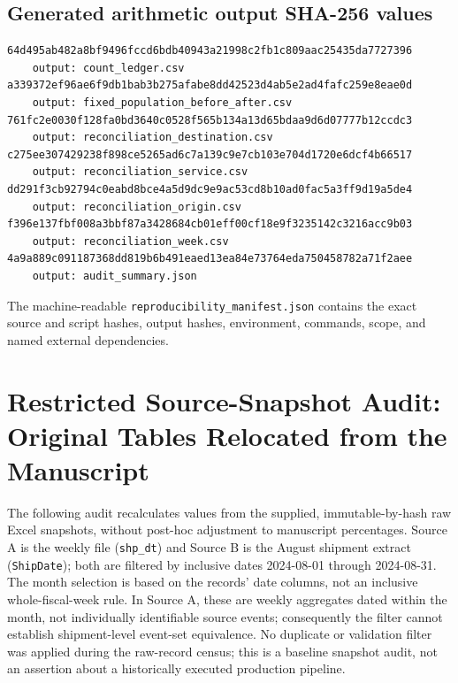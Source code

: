 \documentclass[11pt]{article}
\begin{document}
\subsection{Generated arithmetic output SHA-256 values}
\begin{small}\begin{verbatim}
64d495ab482a8bf9496fccd6bdb40943a21998c2fb1c809aac25435da7727396
    output: count_ledger.csv
a339372ef96ae6f9db1bab3b275afabe8dd42523d4ab5e2ad4fafc259e8eae0d
    output: fixed_population_before_after.csv
761fc2e0030f128fa0bd3640c0528f565b134a13d65bdaa9d6d07777b12ccdc3
    output: reconciliation_destination.csv
c275ee307429238f898ce5265ad6c7a139c9e7cb103e704d1720e6dcf4b66517
    output: reconciliation_service.csv
dd291f3cb92794c0eabd8bce4a5d9dc9e9ac53cd8b10ad0fac5a3ff9d19a5de4
    output: reconciliation_origin.csv
f396e137fbf008a3bbf87a3428684cb01eff00cf18e9f3235142c3216acc9b03
    output: reconciliation_week.csv
4a9a889c091187368dd819b6b491eaed13ea84e73764eda750458782a71f2aee
    output: audit_summary.json
\end{verbatim}\end{small}
The machine-readable \texttt{reproducibility\_manifest.json} contains the exact source and script hashes, output hashes, environment, commands, scope, and named external dependencies.

\section{Restricted Source-Snapshot Audit: Original Tables Relocated from the Manuscript}
\label{sec:verified-reconciliation}
The following audit recalculates values from the supplied, immutable-by-hash raw Excel snapshots, without post-hoc adjustment to manuscript percentages. Source A is the weekly file (\texttt{shp\_dt}) and Source B is the August shipment extract (\texttt{ShipDate}); both are filtered by inclusive dates 2024-08-01 through 2024-08-31. The month selection is based on the records' date columns, not an inclusive whole-fiscal-week rule. In Source A, these are weekly aggregates dated within the month, not individually identifiable source events; consequently the filter cannot establish shipment-level event-set equivalence. No duplicate or validation filter was applied during the raw-record census; this is a baseline snapshot audit, not an assertion about a historically executed production pipeline.
\end{document}
